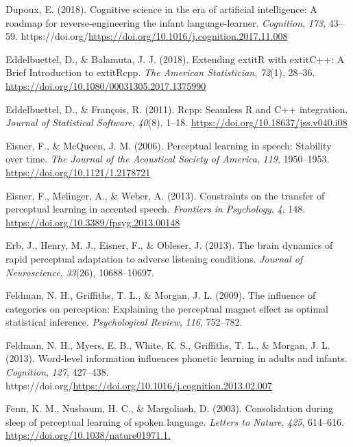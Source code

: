 \documentclass[
  11pt,
  english,
  man,floatsintext]{apa6}
\newlength{\cslhangindent}
\newlength{\cslentryspacingunit} %
\newenvironment{CSLReferences}[2] %
 {%
  \setlength{\parindent}{0pt}
  \ifodd #1
  \let\oldpar\par
  \def\par{\hangindent=\cslhangindent\oldpar}
  \fi
  \setlength{\parskip}{#2\cslentryspacingunit}
 }%
 {}
\begin{document}
\begin{CSLReferences}{1}{0}
\leavevmode{}%
Dupoux, E. (2018). Cognitive science in the era of artificial intelligence: A roadmap for reverse-engineering the infant language-learner. \emph{Cognition}, \emph{173}, 43--59. https://doi.org/\url{https://doi.org/10.1016/j.cognition.2017.11.008}

\leavevmode{}%
Eddelbuettel, D., \& Balamuta, J. J. (2018). {Extending extit{R} with extit{C++}: A Brief Introduction to extit{Rcpp}}. \emph{The American Statistician}, \emph{72}(1), 28--36. \url{https://doi.org/10.1080/00031305.2017.1375990}

\leavevmode{}%
Eddelbuettel, D., \& François, R. (2011). {Rcpp}: Seamless {R} and {C++} integration. \emph{Journal of Statistical Software}, \emph{40}(8), 1--18. \url{https://doi.org/10.18637/jss.v040.i08}

\leavevmode{}%
Eisner, F., \& McQueen, J. M. (2006). Perceptual learning in speech: Stability over time. \emph{The Journal of the Acoustical Society of America}, \emph{119}, 1950--1953. \url{https://doi.org/10.1121/1.2178721}

\leavevmode{}%
Eisner, F., Melinger, A., \& Weber, A. (2013). Constraints on the transfer of perceptual learning in accented speech. \emph{Frontiers in Psychology}, \emph{4}, 148. \url{https://doi.org/10.3389/fpsyg.2013.00148}

\leavevmode{}%
Erb, J., Henry, M. J., Eisner, F., \& Obleser, J. (2013). The brain dynamics of rapid perceptual adaptation to adverse listening conditions. \emph{Journal of Neuroscience}, \emph{33}(26), 10688--10697.

\leavevmode{}%
Feldman, N. H., Griffiths, T. L., \& Morgan, J. L. (2009). The influence of categories on perception: Explaining the perceptual magnet effect as optimal statistical inference. \emph{Psychological Review}, \emph{116}, 752--782.

\leavevmode{}%
Feldman, N. H., Myers, E. B., White, K. S., Griffiths, T. L., \& Morgan, J. L. (2013). Word-level information influences phonetic learning in adults and infants. \emph{Cognition}, \emph{127}, 427--438. https://doi.org/\url{https://doi.org/10.1016/j.cognition.2013.02.007}

\leavevmode{}%
Fenn, K. M., Nusbaum, H. C., \& Margoliash, D. (2003). Consolidation during sleep of perceptual learning of spoken language. \emph{Letters to Nature}, \emph{425}, 614--616. \url{https://doi.org/10.1038/nature01971.1.}


\end{CSLReferences}
\end{document}

